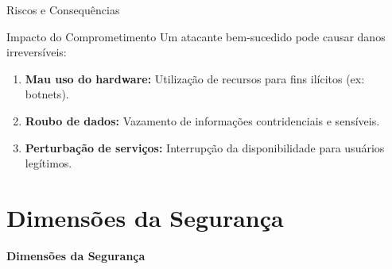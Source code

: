 \documentclass[aspectratio=169]{beamer}
\begin{document}
\begin{frame}{Riscos e Consequências}
    \begin{alertblock}{Impacto do Comprometimento}
        Um atacante bem-sucedido pode causar danos irreversíveis:
    \end{alertblock}
    \begin{enumerate}
        \item \textbf{Mau uso do hardware:} Utilização de recursos para fins ilícitos (ex: botnets).
        \item \textbf{Roubo de dados:} Vazamento de informações contridenciais e sensíveis.
        \item \textbf{Perturbação de serviços:} Interrupção da disponibilidade para usuários legítimos.
    \end{enumerate}
\end{frame}

\section{Dimensões da Segurança}
{
\begin{frame}[plain]
    \centering
    \Huge \color{white} \bfseries Dimensões da Segurança
\end{frame}
}
\end{document}
